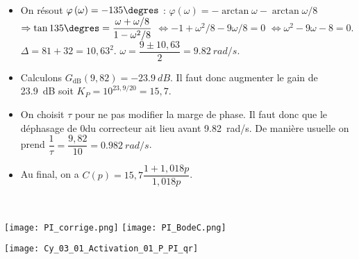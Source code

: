 \ifprof
\begin{corrige}~\\

\begin{itemize}
\item On résout $\varphi\left(\omega\right)=-135\degres$ : 
$\varphi\left(\omega\right)=-\arctan \omega-\arctan \omega/8 $ $\Rightarrow \tan 135\degres = \dfrac{\omega+\omega/8}{1-\omega^2/8}$ 
$\Leftrightarrow - 1+\omega^2/8-9\omega/8=0$ 
$\Leftrightarrow  \omega^2 -9\omega-8 =0$. 
$\Delta = 81+32=10,63^2$. 
$\omega = \dfrac{9\pm10,63}{2}=\SI{9,82}{rad/s}$.


\item Calculons $G_{\text{dB}}(9,82)=\SI{-23,9}{dB}$. Il faut donc augmenter le gain de \SI{23,9}{dB} soit $K_P=10^{23,9/20}=15,7$.

\item On choisit $\tau$ pour ne pas modifier la marge de phase. Il faut donc que le déphasage de 0\degres du correcteur ait lieu  avant \SI{9,82}{rad/s}. De manière usuelle on prend $\dfrac{1}{\tau}=\dfrac{9,82}{10}=\SI{0,982}{rad/s}$.

\item Au final, on a $C(p)=15,7\dfrac{1+1,018p}{1,018p}$.
\end{itemize}

\end{corrige}
\else\fi


\ifprof
\begin{corrige}~\\
\begin{center}
\texttt{[image: PI\_corrige.png]}
\texttt{[image: PI\_BodeC.png]}
\end{center}
\end{corrige}
\else
\fi

\ifprof
\else
\begin{marginfigure}[-3cm]
\centering
\texttt{[image: Cy\_03\_01\_Activation\_01\_P\_PI\_qr]}
\end{marginfigure}
\fi

\ifcolle
\else
\ifprof
\else
{}
\fi
\fi

